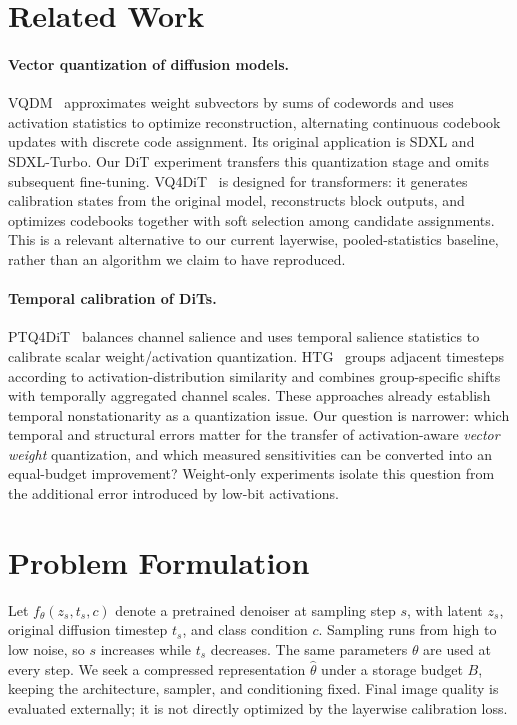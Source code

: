 \documentclass{article}
\begin{document}
\section{Related Work}\label{sec:rw}

\paragraph{Vector quantization of diffusion models.}
VQDM~\citep{egiazarian2024vqdm} approximates weight subvectors by sums of codewords and uses activation statistics to optimize reconstruction, alternating continuous codebook updates with discrete code assignment. Its original application is SDXL and SDXL-Turbo. Our DiT experiment transfers this quantization stage and omits subsequent fine-tuning. VQ4DiT~\citep{deng2024vq4dit} is designed for transformers: it generates calibration states from the original model, reconstructs block outputs, and optimizes codebooks together with soft selection among candidate assignments. This is a relevant alternative to our current layerwise, pooled-statistics baseline, rather than an algorithm we claim to have reproduced.

\paragraph{Temporal calibration of DiTs.}
PTQ4DiT~\citep{wu2024ptq4dit} balances channel salience and uses temporal salience statistics to calibrate scalar weight/activation quantization. HTG~\citep{ding2025htg} groups adjacent timesteps according to activation-distribution similarity and combines group-specific shifts with temporally aggregated channel scales. These approaches already establish temporal nonstationarity as a quantization issue. Our question is narrower: which temporal and structural errors matter for the transfer of activation-aware \emph{vector weight} quantization, and which measured sensitivities can be converted into an equal-budget improvement? Weight-only experiments isolate this question from the additional error introduced by low-bit activations.

\section{Problem Formulation}\label{sec:problem}

Let $f_{\theta}(z_s,t_s,c)$ denote a pretrained denoiser at sampling step $s$, with latent $z_s$, original diffusion timestep $t_s$, and class condition $c$. Sampling runs from high to low noise, so $s$ increases while $t_s$ decreases. The same parameters $\theta$ are used at every step. We seek a compressed representation $\widehat\theta$ under a storage budget $B$, keeping the architecture, sampler, and conditioning fixed. Final image quality is evaluated externally; it is not directly optimized by the layerwise calibration loss.
\end{document}
